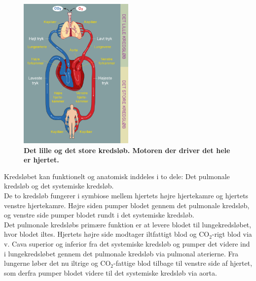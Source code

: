 \begin{figure}[H]
\includegraphics[width =0.5\textwidth , center]{billeder/hjertet}
\caption{\textbf{Det lille og det store kredsløb. Motoren der driver det hele er hjertet. \cite{hjertet}}}
\end{figure}
Kredsløbet kan funktionelt og anatomisk inddeles i to dele: Det pulmonale kredsløb og det systemiske kredsløb.\\
De to kredsløb fungerer i symbiose mellem hjertets højre hjertekamre og hjertets venstre hjertekamre. Højre siden pumper blodet gennem det pulmonale kredsløb, og venstre side pumper blodet rundt i det systemiske kredsløb.\\
Det pulmonale kredsløbs primære funktion er at levere blodet til lungekredsløbet, hvor blodet iltes. Hjertets højre side modtager iltfattigt blod og CO$_{2}$-rigt blod via v. Cava superior og inferior fra det systemiske kredsløb og pumper det videre ind i lungekredsløbet gennem det pulmonale kredsløb via pulmonal aterierne. Fra lungerne løber det nu iltrige og CO$_{2}$-fattige blod tilbage til venstre side af hjertet, som derfra pumper blodet videre til det systemiske kredsløb via aorta. \cite{pulmonal} 
